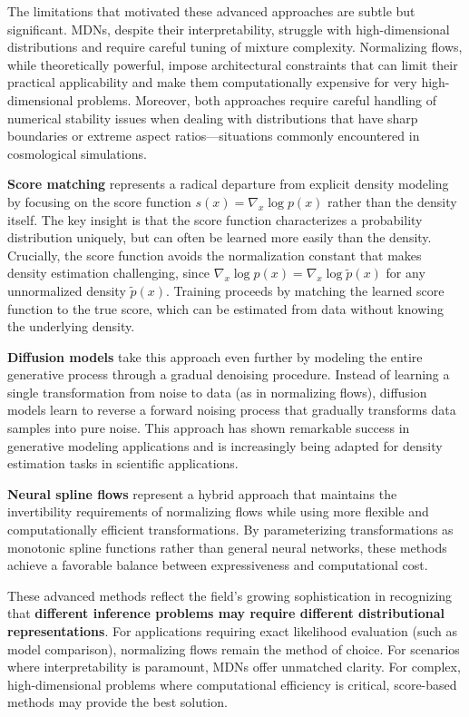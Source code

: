 \documentclass{SciPost}
\begin{document}
The limitations that motivated these advanced approaches are subtle but significant. MDNs, despite their interpretability, struggle with high-dimensional distributions and require careful tuning of mixture complexity. Normalizing flows, while theoretically powerful, impose architectural constraints that can limit their practical applicability and make them computationally expensive for very high-dimensional problems. Moreover, both approaches require careful handling of numerical stability issues when dealing with distributions that have sharp boundaries or extreme aspect ratios—situations commonly encountered in cosmological simulations.

\textbf{Score matching} represents a radical departure from explicit density modeling by focusing on the score function $s(x) = \nabla_x \log p(x)$ rather than the density itself. The key insight is that the score function characterizes a probability distribution uniquely, but can often be learned more easily than the density. Crucially, the score function avoids the normalization constant that makes density estimation challenging, since $\nabla_x \log p(x) = \nabla_x \log \tilde{p}(x)$ for any unnormalized density $\tilde{p}(x)$. Training proceeds by matching the learned score function to the true score, which can be estimated from data without knowing the underlying density.

\textbf{Diffusion models} take this approach even further by modeling the entire generative process through a gradual denoising procedure. Instead of learning a single transformation from noise to data (as in normalizing flows), diffusion models learn to reverse a forward noising process that gradually transforms data samples into pure noise. This approach has shown remarkable success in generative modeling applications and is increasingly being adapted for density estimation tasks in scientific applications.

\textbf{Neural spline flows} represent a hybrid approach that maintains the invertibility requirements of normalizing flows while using more flexible and computationally efficient transformations. By parameterizing transformations as monotonic spline functions rather than general neural networks, these methods achieve a favorable balance between expressiveness and computational cost.

These advanced methods reflect the field's growing sophistication in recognizing that \textbf{different inference problems may require different distributional representations}. For applications requiring exact likelihood evaluation (such as model comparison), normalizing flows remain the method of choice. For scenarios where interpretability is paramount, MDNs offer unmatched clarity. For complex, high-dimensional problems where computational efficiency is critical, score-based methods may provide the best solution.
\end{document}
